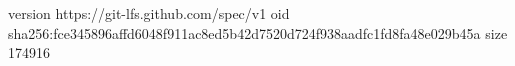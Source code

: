 version https://git-lfs.github.com/spec/v1
oid sha256:fce345896affd6048f911ac8ed5b42d7520d724f938aadfc1fd8fa48e029b45a
size 174916
